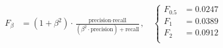 \begin{align}\label{eq:f_score}
    F_\beta &= (1+\beta^2) \cdot \frac{\text{precision} \cdot \text{recall}}{(\beta^2\cdot\text{precision}) + \text{recall}},\quad
    \begin{cases} 
    F_{0.5} &= 0.0247\\ 
    F_1     &= 0.0389\\ 
    F_2     &= 0.0912\\ 
    \end{cases}
\end{align}
